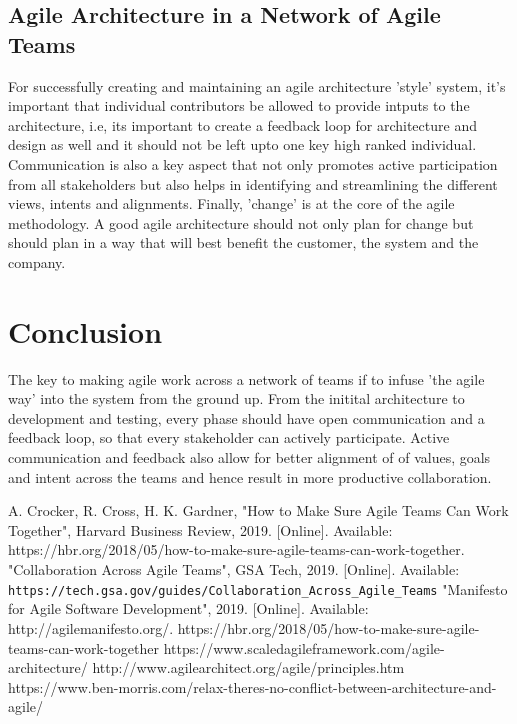 \documentclass[sigplan,screen]{acmart}
\begin{document}
\subsection{Agile Architecture in a Network of Agile Teams}
For successfully creating and maintaining an agile architecture 'style' system, it's important that individual contributors be allowed to provide intputs to the architecture, i.e, its important to create a feedback loop for architecture and design as well and it should not be left upto one key high ranked individual.
Communication is also a key aspect that not only promotes active participation from all stakeholders but also helps in identifying and streamlining the different views, intents and alignments.
Finally, 'change' is at the core of the agile methodology. A good agile architecture should not only plan for change but should plan in a way that will best benefit the customer, the system and the company.   

\section{Conclusion}
The key to making agile work across a network of teams if to infuse 'the agile way' into the system from the ground up.
From the initital architecture to development and testing, every phase should have open communication and a feedback loop, so that every stakeholder can actively participate.
Active communication and feedback also allow for better alignment of of values, goals and intent across the teams and hence result in more productive collaboration.  
 
\begin{thebibliography}{00}
   A. Crocker, R. Cross, H. K. Gardner, "How to Make Sure Agile Teams Can Work Together", Harvard Business Review, 2019. [Online]. Available: https://hbr.org/2018/05/how-to-make-sure-agile-teams-can-work-together.
   "Collaboration Across Agile Teams", GSA Tech, 2019. [Online]. Available: \verb| https://tech.gsa.gov/guides/Collaboration_Across_Agile_Teams|
   "Manifesto for Agile Software Development", 2019. [Online]. Available: http://agilemanifesto.org/.
   https://hbr.org/2018/05/how-to-make-sure-agile-teams-can-work-together 
   https://www.scaledagileframework.com/agile-architecture/
   http://www.agilearchitect.org/agile/principles.htm 
   https://www.ben-morris.com/relax-theres-no-conflict-between-architecture-and-agile/ 
\end{thebibliography}
\end{document}
